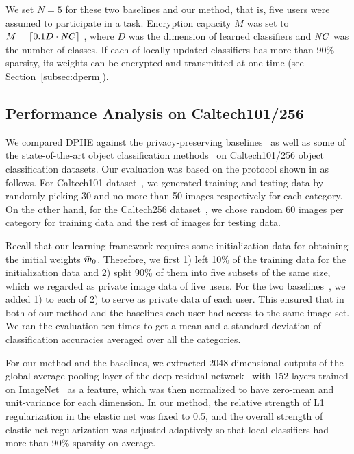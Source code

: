 \documentclass[10pt,twocolumn,letterpaper]{article}
\def\vct#1{\mbox{\boldmath $#1$}}
\begin{document}
We set $N=5$ for these two baselines and our method, that is, five users were assumed to participate in a task. Encryption capacity $M$ was set to $M=\lceil 0.1D\cdot{\it NC}\rceil$ , where $D$ was the dimension of learned classifiers and ${\it NC}$ was the number of classes. If each of locally-updated classifiers has more than 90\% sparsity, its weights can be encrypted and transmitted at one time (see Section~\ref{subsec:dperm}).

\subsection{Performance Analysis on Caltech101/256}
\label{subsec:exp_caltech}
We compared DPHE against the privacy-preserving baselines~\cite{Pathak2010a,Rajkumar2012a} as well as some of the state-of-the-art object classification methods~\cite{He2015a,Zeiler2014a} on Caltech101/256 object classification datasets. Our evaluation was based on the protocol shown in \cite{He2015a, Zeiler2014a} as follows. For Caltech101 dataset~\cite{Fei-Fei2007a}, we generated training and testing data by randomly picking 30 and no more than 50 images respectively for each category. On the other hand, for the Caltech256 dataset~\cite{Griffin2007a}, we chose random 60 images per category for training data and the rest of images for testing data. 

Recall that our learning framework requires some initialization data for obtaining the initial weights $\bar{\vct{w}}_0$. Therefore, we first 1) left 10\% of the training data for the initialization data and 2) split 90\% of them into five subsets of the same size, which we regarded as private image data of five users. For the two baselines~\cite{Pathak2010a,Rajkumar2012a}, we added 1) to each of 2) to serve as private data of each user. This ensured that in both of our method and the baselines each user had access to the same image set. We ran the evaluation ten times to get a mean and a standard deviation of classification accuracies averaged over all the categories.

For our method and the baselines, we extracted 2048-dimensional outputs of the global-average pooling layer of the deep residual network~\cite{He2016a} with 152 layers trained on ImageNet~\cite{Russakovsky2015a} as a feature, which was then normalized to have zero-mean and unit-variance for each dimension. In our method, the relative strength of L1 regularization in the elastic net was fixed to 0.5, and the overall strength of elastic-net regularization was adjusted adaptively so that local classifiers had more than 90\% sparsity on average. 
\end{document}
